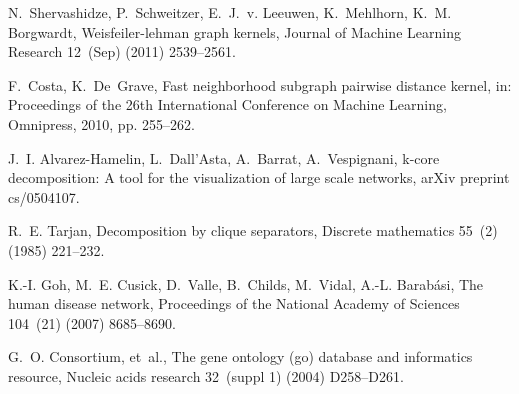 \documentclass[review]{elsarticle}
\begin{document}
\begin{thebibliography}{10}
N.~Shervashidze, P.~Schweitzer, E.~J.~v. Leeuwen, K.~Mehlhorn, K.~M. Borgwardt,
  Weisfeiler-lehman graph kernels, Journal of Machine Learning Research
  12~(Sep) (2011) 2539--2561.

F.~Costa, K.~De~Grave, Fast neighborhood subgraph pairwise distance kernel, in:
  Proceedings of the 26th International Conference on Machine Learning,
  Omnipress, 2010, pp. 255--262.

J.~I. Alvarez-Hamelin, L.~Dall'Asta, A.~Barrat, A.~Vespignani, k-core
  decomposition: A tool for the visualization of large scale networks, arXiv
  preprint cs/0504107.

R.~E. Tarjan, Decomposition by clique separators, Discrete mathematics 55~(2)
  (1985) 221--232.

K.-I. Goh, M.~E. Cusick, D.~Valle, B.~Childs, M.~Vidal, A.-L. Barab{\'a}si, The
  human disease network, Proceedings of the National Academy of Sciences
  104~(21) (2007) 8685--8690.

G.~O. Consortium, et~al., The gene ontology (go) database and informatics
  resource, Nucleic acids research 32~(suppl 1) (2004) D258--D261.

\end{thebibliography}
\end{document}

